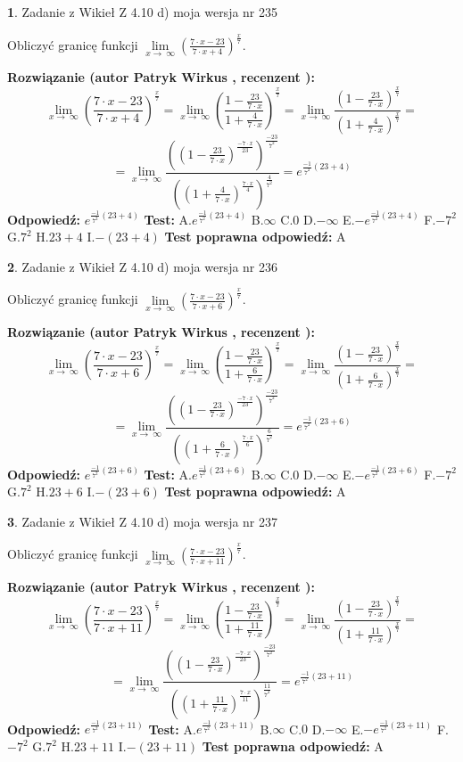 \documentclass[12pt, a4paper]{article}
\theoremstyle{definition} %
\newtheorem{zad}{}
\newcommand{\zadStart}[1]{\begin{zad}#1\newline}
\newcommand{\zadStop}{\end{zad}}
\newcommand{\rozwStart}[2]{\noindent \textbf{Rozwiązanie (autor #1 , recenzent #2): }\newline}
\newcommand{\rozwStop}{\newline}
\newcommand{\odpStart}{\noindent \textbf{Odpowiedź:}\newline}
\newcommand{\odpStop}{\newline}
\newcommand{\testStart}{\noindent \textbf{Test:}\newline}
\newcommand{\testStop}{\newline}
\newcommand{\kluczStart}{\noindent \textbf{Test poprawna odpowiedź:}\newline}
\newcommand{\kluczStop}{\newline}
\begin{document}
\zadStart{Zadanie z Wikieł Z 4.10 d) moja wersja nr 235}


Obliczyć granicę funkcji  $\lim\limits_{x\to\ \infty}(\frac{7\cdot x-23}{7\cdot x+4})^{\frac{x}{7}}$.
\zadStop
\rozwStart{Patryk Wirkus}{}
$$\lim\limits_{x\to\ \infty}(\frac{7\cdot x-23}{7\cdot x+4})^{\frac{x}{7}} = \lim\limits_{x\to\ \infty}(\frac{1-\frac{23}{7\cdot x}}{1+\frac{4}{7\cdot x}})^{\frac{x}{7}}=\lim\limits_{x\to\ \infty}\frac{(1-\frac{23}{7\cdot x})^{\frac{x}{7}}}{(1+\frac{4}{7\cdot x})^{\frac{x}{7}}}=$$
$$=\lim\limits_{x\to\ \infty}\frac{((1-\frac{23}{7\cdot x})^{\frac{-7\cdot x}{23}})^{\frac{-23}{7^{2}}}}{((1+\frac{4}{7\cdot x})^{\frac{7\cdot x}{4}})^{\frac{4}{7^{2}}}}=e^{\frac{-1}{7^{2}}(23+4)}$$
\rozwStop
\odpStart
$e^{\frac{-1}{7^{2}}(23+4)}$
\odpStop
\testStart
A.$e^{\frac{-1}{7^{2}}(23+4)}$ B.$\infty$ C.$0$ D.$-\infty$ E.$-e^{\frac{-1}{7^{2}}(23+4)}$
F.$-7^{2}$ G.$7^{2}$
H.$23+4$
I.$-(23+4)$
\testStop
\kluczStart
A
\kluczStop



\zadStart{Zadanie z Wikieł Z 4.10 d) moja wersja nr 236}


Obliczyć granicę funkcji  $\lim\limits_{x\to\ \infty}(\frac{7\cdot x-23}{7\cdot x+6})^{\frac{x}{7}}$.
\zadStop
\rozwStart{Patryk Wirkus}{}
$$\lim\limits_{x\to\ \infty}(\frac{7\cdot x-23}{7\cdot x+6})^{\frac{x}{7}} = \lim\limits_{x\to\ \infty}(\frac{1-\frac{23}{7\cdot x}}{1+\frac{6}{7\cdot x}})^{\frac{x}{7}}=\lim\limits_{x\to\ \infty}\frac{(1-\frac{23}{7\cdot x})^{\frac{x}{7}}}{(1+\frac{6}{7\cdot x})^{\frac{x}{7}}}=$$
$$=\lim\limits_{x\to\ \infty}\frac{((1-\frac{23}{7\cdot x})^{\frac{-7\cdot x}{23}})^{\frac{-23}{7^{2}}}}{((1+\frac{6}{7\cdot x})^{\frac{7\cdot x}{6}})^{\frac{6}{7^{2}}}}=e^{\frac{-1}{7^{2}}(23+6)}$$
\rozwStop
\odpStart
$e^{\frac{-1}{7^{2}}(23+6)}$
\odpStop
\testStart
A.$e^{\frac{-1}{7^{2}}(23+6)}$ B.$\infty$ C.$0$ D.$-\infty$ E.$-e^{\frac{-1}{7^{2}}(23+6)}$
F.$-7^{2}$ G.$7^{2}$
H.$23+6$
I.$-(23+6)$
\testStop
\kluczStart
A
\kluczStop



\zadStart{Zadanie z Wikieł Z 4.10 d) moja wersja nr 237}


Obliczyć granicę funkcji  $\lim\limits_{x\to\ \infty}(\frac{7\cdot x-23}{7\cdot x+11})^{\frac{x}{7}}$.
\zadStop
\rozwStart{Patryk Wirkus}{}
$$\lim\limits_{x\to\ \infty}(\frac{7\cdot x-23}{7\cdot x+11})^{\frac{x}{7}} = \lim\limits_{x\to\ \infty}(\frac{1-\frac{23}{7\cdot x}}{1+\frac{11}{7\cdot x}})^{\frac{x}{7}}=\lim\limits_{x\to\ \infty}\frac{(1-\frac{23}{7\cdot x})^{\frac{x}{7}}}{(1+\frac{11}{7\cdot x})^{\frac{x}{7}}}=$$
$$=\lim\limits_{x\to\ \infty}\frac{((1-\frac{23}{7\cdot x})^{\frac{-7\cdot x}{23}})^{\frac{-23}{7^{2}}}}{((1+\frac{11}{7\cdot x})^{\frac{7\cdot x}{11}})^{\frac{11}{7^{2}}}}=e^{\frac{-1}{7^{2}}(23+11)}$$
\rozwStop
\odpStart
$e^{\frac{-1}{7^{2}}(23+11)}$
\odpStop
\testStart
A.$e^{\frac{-1}{7^{2}}(23+11)}$ B.$\infty$ C.$0$ D.$-\infty$ E.$-e^{\frac{-1}{7^{2}}(23+11)}$
F.$-7^{2}$ G.$7^{2}$
H.$23+11$
I.$-(23+11)$
\testStop
\kluczStart
A
\kluczStop
\end{document}
